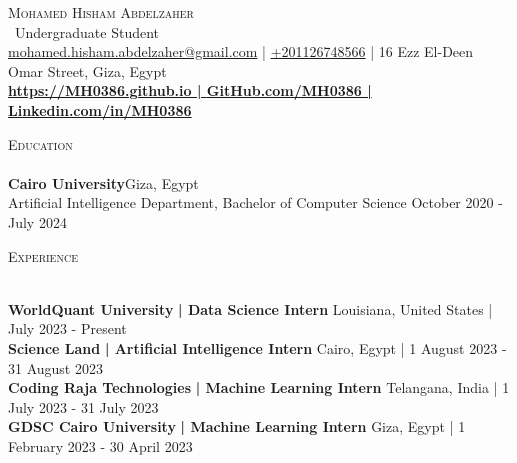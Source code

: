 \documentclass[a4paper]{article}
\newcommand{\lineunder} {
    \vspace*{-8pt} \\
    \hspace*{-18pt} \hrulefill \\
}
\newcommand{\header} [1] {
    {\hspace*{-18pt}\vspace*{6pt} \textsc{#1}}
    \vspace*{-6pt} \lineunder
}
\begin{document}
    \vspace*{-40pt}

    

%
%
  \vspace*{-2pt}
  \begin{center}
    {\Huge \scshape {Mohamed Hisham Abdelzaher}}\\
    \vspace*{2pt}
    \ {Undergraduate Student}\\
    \vspace*{2pt}
    \href{mailto:mohamed.hisham.abdelzaher@gmail.com}{mohamed.hisham.abdelzaher@gmail.com} | \href{tel:+201126748566}{+201126748566} | 16 Ezz El-Deen Omar Street, Giza, Egypt\\
    \vspace*{2pt}
    \textbf{\href{https://mh0386.github.io}{https://MH0386.github.io | }}\textbf{\href{https://github.com/MH0386}{GitHub.com/MH0386 | }}\textbf{\href{https://linkedin.com/in/MH0386}{Linkedin.com/in/MH0386}}\\
  \end{center}



      \header{Education}
      \vspace{2mm}
      \textbf{Cairo University}\hfill Giza, Egypt\\
Artificial Intelligence Department, Bachelor of Computer Science \hfill October 2020 - July 2024\\
\vspace{2mm}

%
%
  \header{Experience}
  \vspace{2mm}

  \textbf{WorldQuant University}\textbf{ | Data Science Intern} \hfill Louisiana, United States | July 2023 - Present\\
  \textbf{Science Land}\textbf{ | Artificial Intelligence Intern} \hfill Cairo, Egypt | 1 August 2023 - 31 August 2023\\
  \textbf{Coding Raja Technologies}\textbf{ | Machine Learning Intern} \hfill Telangana, India | 1 July 2023 - 31 July 2023\\
  \textbf{GDSC Cairo University}\textbf{ | Machine Learning Intern} \hfill Giza, Egypt | 1 February 2023 - 30 April 2023\\
\end{document}
